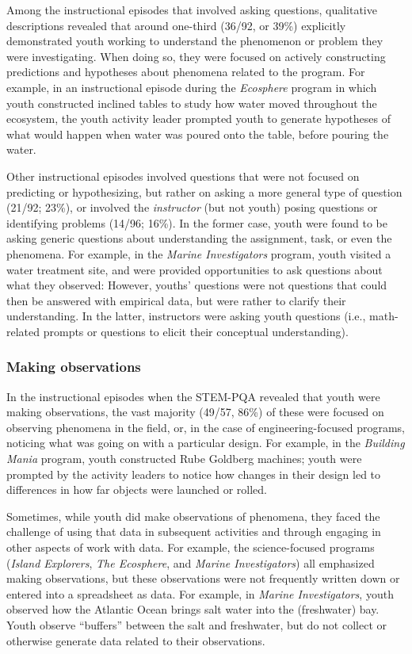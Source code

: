 \documentclass[]{msu-thesis}
\theoremstyle{definition}
\theoremstyle{definition}
\theoremstyle{definition}
\theoremstyle{remark}
\begin{document}
Among the instructional episodes that involved asking questions,
qualitative descriptions revealed that around one-third (36/92, or 39\%)
explicitly demonstrated youth working to understand the phenomenon or
problem they were investigating. When doing so, they were focused on
actively constructing predictions and hypotheses about phenomena related
to the program. For example, in an instructional episode during the
\emph{Ecosphere} program in which youth constructed inclined tables to
study how water moved throughout the ecosystem, the youth activity
leader prompted youth to generate hypotheses of what would happen when
water was poured onto the table, before pouring the water.

Other instructional episodes involved questions that were not focused on
predicting or hypothesizing, but rather on asking a more general type of
question (21/92; 23\%), or involved the \emph{instructor} (but not
youth) posing questions or identifying problems (14/96; 16\%). In the
former case, youth were found to be asking generic questions about
understanding the assignment, task, or even the phenomena. For example,
in the \emph{Marine Investigators} program, youth visited a water
treatment site, and were provided opportunities to ask questions about
what they observed: However, youths' questions were not questions that
could then be answered with empirical data, but were rather to clarify
their understanding. In the latter, instructors were asking youth
questions (i.e., math-related prompts or questions to elicit their
conceptual understanding).

\subsubsection{Making observations}\label{making-observations}

In the instructional episodes when the STEM-PQA revealed that youth were
making observations, the vast majority (49/57, 86\%) of these were
focused on observing phenomena in the field, or, in the case of
engineering-focused programs, noticing what was going on with a
particular design. For example, in the \emph{Building Mania} program,
youth constructed Rube Goldberg machines; youth were prompted by the
activity leaders to notice how changes in their design led to
differences in how far objects were launched or rolled.

Sometimes, while youth did make observations of phenomena, they faced
the challenge of using that data in subsequent activities and through
engaging in other aspects of work with data. For example, the
science-focused programs (\emph{Island Explorers}, \emph{The Ecosphere},
and \emph{Marine Investigators}) all emphasized making observations, but
these observations were not frequently written down or entered into a
spreadsheet as data. For example, in \emph{Marine Investigators}, youth
observed how the Atlantic Ocean brings salt water into the (freshwater)
bay. Youth observe ``buffers'' between the salt and freshwater, but do
not collect or otherwise generate data related to their observations.
\end{document}
